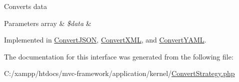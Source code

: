 Converts data


\begin{DoxyParams}[1]{Parameters}
array & {\em \$data} & \\
\hline
\end{DoxyParams}


Implemented in \hyperlink{class_convert_j_s_o_n_a41444ea294bbd35a6c07ef4e9faeae10}{Convert\+J\+S\+ON}, \hyperlink{class_convert_x_m_l_a41444ea294bbd35a6c07ef4e9faeae10}{Convert\+X\+ML}, and \hyperlink{class_convert_y_a_m_l_a41444ea294bbd35a6c07ef4e9faeae10}{Convert\+Y\+A\+ML}.



The documentation for this interface was generated from the following file\+:\begin{DoxyCompactItemize}
\item 
C\+:/xampp/htdocs/mvc-\/framework/application/kernel/\hyperlink{_convert_strategy_8php}{Convert\+Strategy.\+php}\end{DoxyCompactItemize}
